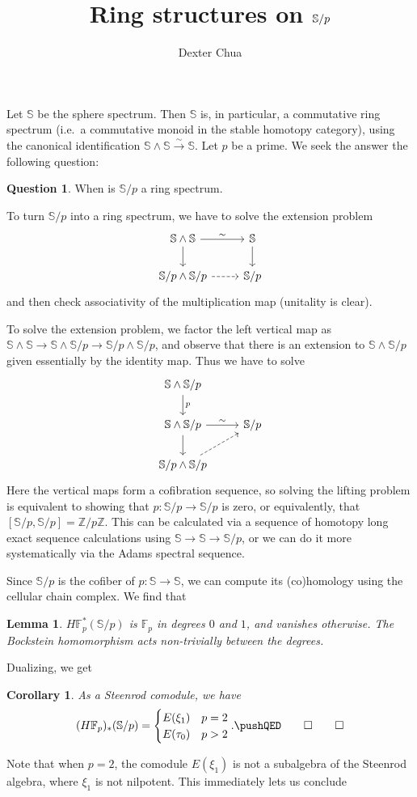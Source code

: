 \documentclass{shortart}
\title{Ring structures on \texorpdfstring{$\S/p$}{S/p}}
\author{Dexter Chua}
\newtheorem*{lemma}{Lemma}
\newtheorem*{cor}{Corollary}
\theoremstyle{definition}
\newtheorem*{ques}{Question}
\renewcommand\S{\mathbb{S}}
\newcommand\F{\mathbb{F}}
\newcommand\Z{\mathbb{Z}}
\begin{document}
Let $\S$ be the sphere spectrum. Then $\S$ is, in particular, a commutative ring spectrum (i.e.\ a commutative monoid in the stable homotopy category), using the canonical identification $\S \wedge \S \overset{\sim}{\to} \S$. Let $p$ be a prime. We seek the answer the following question:
\begin{ques}
  When is $\S/p$ a ring spectrum.
\end{ques}

To turn $\S/p$ into a ring spectrum, we have to solve the extension problem
\[
  \begin{tikzcd}
    \S \wedge \S \ar[r, "\sim"] \ar[d] & \S \ar[d]\\
    \S/p \wedge \S/p \ar[r, dashed] & \S/p
  \end{tikzcd}
\]
and then check associativity of the multiplication map (unitality is clear).

To solve the extension problem, we factor the left vertical map as $\S \wedge \S \to \S \wedge \S/p \to \S/p \wedge \S/p$, and observe that there is an extension to $\S \wedge \S/p$ given essentially by the identity map. Thus we have to solve
\[
  \begin{tikzcd}
    \S \wedge \S/p \ar[d, "p"] \\
    \S \wedge \S/p \ar[r, "\sim"] \ar[d] & \S/p\\
    \S/p \wedge \S/p \ar[ur, dashed]
  \end{tikzcd}
\]
Here the vertical maps form a cofibration sequence, so solving the lifting problem is equivalent to showing that $p: \S/p \to \S/p$ is zero, or equivalently, that $[\S/p, \S/p] = \Z/p\Z$. This can be calculated via a sequence of homotopy long exact sequence calculations using $\S \to \S \to \S/p$, or we can do it more systematically via the Adams spectral sequence.

Since $\S/p$ is the cofiber of $p: \S \to \S$, we can compute its (co)homology using the cellular chain complex. We find that
\begin{lemma}
  $H\F_p^*(\S/p)$ is $\F_p$ in degrees $0$ and $1$, and vanishes otherwise. The Bockstein homomorphism acts non-trivially between the degrees.\fakeqed
\end{lemma}

Dualizing, we get
\begin{cor}
  As a Steenrod comodule, we have
  \[
    (H\F_p)_*(\S/p) = 
    \begin{cases}
      E(\xi_1) & p = 2\\
      E(\tau_0) & p > 2
    \end{cases}.\fakeqed
  \]
\end{cor}
Note that when $p = 2$, the comodule $E(\xi_1)$ is not a subalgebra of the Steenrod algebra, where $\xi_1$ is not nilpotent. This immediately lets us conclude
\end{document}
